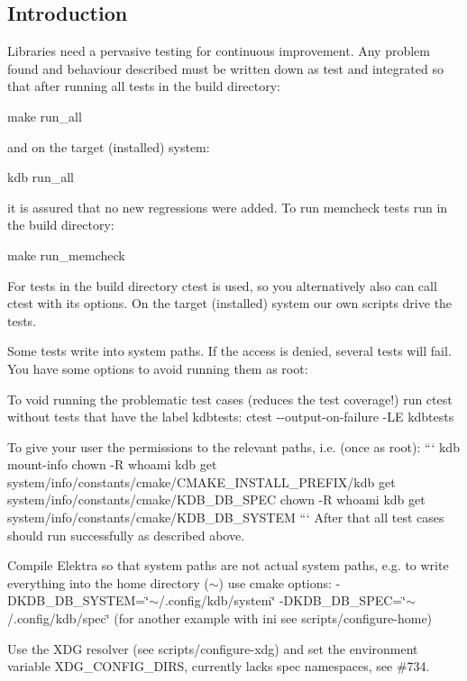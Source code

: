 \subsection*{Introduction}

Libraries need a pervasive testing for continuous improvement. Any problem found and behaviour described must be written down as test and integrated so that after running all tests in the build directory\+: \begin{DoxyVerb}make run_all
\end{DoxyVerb}


and on the target (installed) system\+: \begin{DoxyVerb}kdb run_all
\end{DoxyVerb}


it is assured that no new regressions were added. To run memcheck tests run in the build directory\+: \begin{DoxyVerb}make run_memcheck
\end{DoxyVerb}


For tests in the build directory ctest is used, so you alternatively also can call ctest with its options. On the target (installed) system our own scripts drive the tests.

Some tests write into system paths. If the access is denied, several tests will fail. You have some options to avoid running them as root\+:


\begin{DoxyEnumerate}
\item To void running the problematic test cases (reduces the test coverage!) run ctest without tests that have the label {\ttfamily kdbtests}\+: {\ttfamily ctest -\/-\/output-\/on-\/failure -\/\+L\+E kdbtests}
\item To give your user the permissions to the relevant paths, i.\+e. (once as root)\+: ``` kdb mount-\/info chown -\/\+R {\ttfamily whoami} {\ttfamily kdb get system/info/constants/cmake/\+C\+M\+A\+K\+E\+\_\+\+I\+N\+S\+T\+A\+L\+L\+\_\+\+P\+R\+E\+F\+I\+X}/{\ttfamily kdb get system/info/constants/cmake/\+K\+D\+B\+\_\+\+D\+B\+\_\+\+S\+P\+E\+C} chown -\/\+R {\ttfamily whoami} {\ttfamily kdb get system/info/constants/cmake/\+K\+D\+B\+\_\+\+D\+B\+\_\+\+S\+Y\+S\+T\+E\+M} ``` After that all test cases should run successfully as described above.
\item Compile Elektra so that system paths are not actual system paths, e.\+g. to write everything into the home directory ({\ttfamily $\sim$}) use cmake options\+: {\ttfamily -\/\+D\+K\+D\+B\+\_\+\+D\+B\+\_\+\+S\+Y\+S\+T\+E\+M=\char`\"{}$\sim$/.\+config/kdb/system\char`\"{} -\/\+D\+K\+D\+B\+\_\+\+D\+B\+\_\+\+S\+P\+E\+C=\char`\"{}$\sim$/.\+config/kdb/spec\char`\"{}} (for another example with ini see {\ttfamily scripts/configure-\/home})
\item Use the X\+D\+G resolver (see {\ttfamily scripts/configure-\/xdg}) and set the environment variable {\ttfamily X\+D\+G\+\_\+\+C\+O\+N\+F\+I\+G\+\_\+\+D\+I\+R\+S}, currently lacks spec namespaces, see \#734.
\end{DoxyEnumerate}

